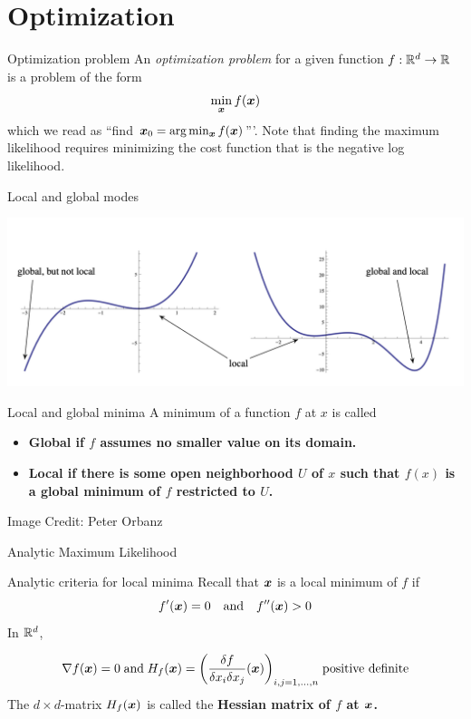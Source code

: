 \documentclass[10pt]{beamer}
\begin{document}
\section{Optimization}

\begin{frame}{Optimization problem}
An \textit{optimization problem} for a given function $f : \mathbb{R}^d \to \mathbb{R}$ is a problem of the form 
\[ \min_{{\boldsymbol x}} f ({\boldsymbol x}) \]
which we read as ``find ${\boldsymbol x}_0 = \arg\min_{{\boldsymbol x}} f ({\boldsymbol x})$'''. 
\vfill
Note that finding the maximum likelihood requires minimizing the cost function that is the negative log likelihood.

\end{frame}

\begin{frame}{Local and global modes}

\begin{center}
\includegraphics[width=.8\textwidth]{images/types_of_minima}
\end{center}


\begin{sblock}{Local and global minima}
A minimum of a function $f$ at $x$ is called
\begin{itemize}
\item \bf{Global} if $f$ assumes no smaller value on its domain.
\item \bf{Local} if there is some open neighborhood $U$ of $x$ such that $f(x)$ is a global minimum of $f$ restricted to $U$.
\end{itemize}
\end{sblock}
\tiny \hfill Image Credit: Peter Orbanz
\end{frame}


\begin{frame}{Analytic Maximum Likelihood}



\begin{sblock}{Analytic criteria for local minima}
Recall that ${\boldsymbol x}$ is a local minimum of $f$ if
\[ f^\prime({\boldsymbol x}) = 0 \quad \text{and} \quad  f^{\prime \prime}({\boldsymbol x}) > 0  \]
In $\mathbb{R}^d$,

\[ \nabla f ({\boldsymbol x})  = 0 \; \text{and} \; H_f ({\boldsymbol x}) = \bigg( {\displaystyle\frac{\delta f}{\delta  x_i  \delta x_j}  ({\boldsymbol x}) } \bigg)_{ i,j= 1,...,n}   \; \text{positive definite} \]  
The $d \times  d$-matrix $H_f ({\boldsymbol x})$ is called the \bf{Hessian matrix} of $f$ at ${\boldsymbol x}$.
\end{sblock}

\end{frame}
\end{document}
